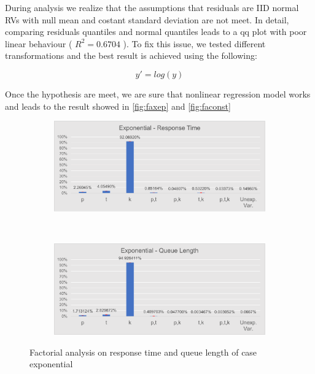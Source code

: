\documentclass[a4paper,12pt]{article}
\begin{document}
During analysis we realize that the assumptions that residuals are IID normal RVs with null mean and costant standard deviation are not meet. 
In detail, comparing residuals quantiles and normal quantiles leads to a qq plot with poor linear behaviour ( $R^2 = 0.6704$ ). To fix this issue, we tested 
different transformations and the best result is achieved using the following:

$$y' = log(y)$$

Once the hypothesis are meet, we are sure that nonlinear regression model works and leads to the result showed in \ref{fig:faxep} and \ref{fig:faconst}

\begin{figure}
  \centering
  \begin{subfigure}[b]{.45\textwidth}
    \includegraphics[width=\textwidth]{img/FactorAnalysisResponseTimeEXP.pdf}
  \end{subfigure}
  ~
  \begin{subfigure}[b]{.45\textwidth}
    \includegraphics[width=\textwidth]{img/FactorAnalysisQueueLengthEXP.pdf}
  \end{subfigure}
  \caption{Factorial analysis on response time and queue length of case exponential }
  \label{fig:faexp}
\end{figure}
\end{document}
